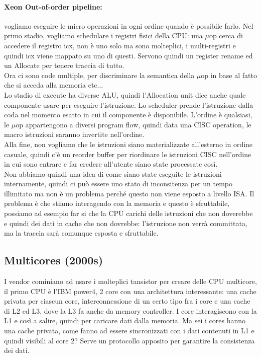 \documentclass[12pt, oneside]{extbook} %
\begin{document}
\paragraph{Xeon Out-of-order pipeline:}
vogliamo eseguire le micro operazioni in ogni ordine quando è possibile farlo. Nel primo stadio, vogliamo schedulare i registri fisici della CPU: una $\mu$op cerca di accedere il registro icx, non è uno solo ma sono molteplici, i multi-registri e quindi icx viene mappato su uno di questi. Servono quindi un register rename ed un Allocate per tenere traccia di tutto.\\ Ora ci sono code multiple, per discriminare la semantica della $\mu$op in base al fatto che si acceda alla memoria etc...\\ Lo stadio di execute ha diverse ALU, quindi l'Allocation unit dice anche quale componente usare per eseguire l'istruzione. Lo scheduler prende l'istruzione dalla coda nel momento esatto in cui il componente è disponibile. L'ordine è qualsiasi, le $\mu$op appartengono a diversi program flow, quindi data una CISC operation, le macro istruzioni saranno invertite nell'ordine. \\ Alla fine, non vogliamo che le istruzioni siano materializzate all'esterno in ordine casuale, quindi c'è un reorder buffer per riordinare le istruzioni CISC nell'ordine in cui sono entrare e far credere all'utente siano state processate così.\\ Non abbiamo quindi una idea di come siano state eseguite le istruzioni internamente, quindi ci può essere uno stato di inconsitenza per un tempo illimitato ma non è un problema perché questo non viene esposto a livello ISA. Il problema è che stiamo interagendo con la memoria e questo è sfruttabile, possiamo ad esempio far si che la CPU carichi delle istruzioni che non doverebbe e quindi dei dati in cache che non dovrebbe: l'istruzione non verrà committata, ma la traccia sarà comunque esposta e sfruttabile.
\subsection{Multicores (2000s)}
I vendor cominiano ad usare i molteplici tansistor per creare delle CPU multicore, il primo CPU è l'IBM power4, 2 core con una architettura interessante: una cache privata per ciascun core, interconnessione di un certo tipo fra i core e una cache di L2 ed L3, dove la L3 fa anche da memory controller. I core interagiscono con la L1 e così a salire, quindi per caricare dati dalla memoria. Ma sei i cores hanno una cache privata, come fanno ad essere sincronizzati con i dati contenuti in L1 e quindi visibili al core 2? Serve un protocollo apposito per garantire la consistenza dei dati.
\end{document}

